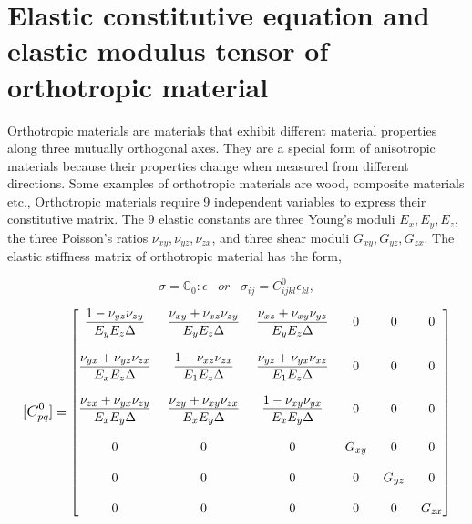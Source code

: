 \documentclass[12pt,twoside]{report}
\begin{document}
\section{Elastic constitutive equation and elastic modulus tensor of orthotropic material}\label{Constitutive matrix}
\indent\indent\indent Orthotropic materials are materials that exhibit different material properties along three mutually orthogonal axes. They are a special form of anisotropic materials because their properties change when measured from different directions. Some examples of orthotropic materials are wood, composite materials etc., Orthotropic materials require 9 independent variables to express their constitutive matrix. The 9 elastic constants are three Young's moduli $E_{x},E_{y},E_{z}$, the three Poisson's ratios $\nu_{xy},\nu_{yz},\nu_{zx}$, and three shear moduli $G_{xy},G_{yz},G_{zx}$. The elastic stiffness matrix of orthotropic material has the form,

\begin{equation}
  \sigma = \mathbb{C}_{0} : \epsilon \;\;\;   or \;\;\;  \sigma_{ij}  =  C^{0}_{ijkl}\epsilon_{kl},
\end{equation}

$$
\mathlarger{ [C^{0}_{pq}]} =  
 \begin{bmatrix}
 \mathlarger{ \frac{1 - \nu_{yz}\nu_{zy}}{E_{y}E_{z}\Delta} } \;&  \mathlarger{  \frac{\nu_{xy} + \nu_{xz}\nu_{zy}}{E_{y}E_{z}\Delta}}   \;& \mathlarger{  \frac{\nu_{xz} + \nu_{xy}\nu_{yz}}{E_{y}E_{z}\Delta} }  \;&  \mathlarger{  0}  \;&  \mathlarger{ 0}  \;& \mathlarger{  0}  \\
 \\
    \mathlarger{ \frac{\nu_{yx} + \nu_{yz}\nu_{zx}}{E_{x}E_{z}\Delta} }  \;& \mathlarger{  \frac{1 - \nu_{xz}\nu_{zx}}{E_{1}E_{z}\Delta} }\; & \mathlarger{ \frac{\nu_{yz} +\nu_{yx}\nu_{xz}}{E_{1}E_{z}\Delta} } \; & \mathlarger{ 0}\; &\mathlarger{  0}\; & \mathlarger{ 0}\\
  \\
   \mathlarger{  \frac{\nu_{zx} + \nu_{yx}\nu_{zy}}{E_{x}E_{y}\Delta}}  \;& \mathlarger{   \frac{\nu_{zy} + \nu_{xy}\nu_{zx}}{E_{x}E_{y}\Delta} }\;&\mathlarger{  \frac{1 - \nu_{xy}\nu_{yx}}{E_{x}E_{y}\Delta} } \;&\mathlarger{  0 }\;& \mathlarger{ 0 }\;&\mathlarger{  0} \\ 
\\

 
 \mathlarger{  0} \;&  \mathlarger{  0 } \;&  \mathlarger{  0 }\;&\mathlarger{ G_{xy}} \;& \mathlarger{0} \;& \mathlarger{0} \\
  \\
 \mathlarger{ 0} \;&  \mathlarger{  0 }\;&  \mathlarger{  0 } \;& \mathlarger{0 }\;& \mathlarger{ G_{yz} }\;&\mathlarger{ 0} \\
  \\
  \mathlarger{0}\;&  \mathlarger{  0 } \;&  \mathlarger{  0 } \;& \mathlarger{0 }\;& \mathlarger{0} \;& \mathlarger{G_{zx}} 
 \end{bmatrix}
 $$\\
 
\end{document}
